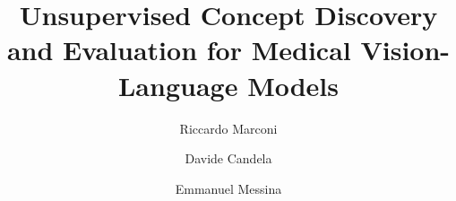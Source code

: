 \documentclass[sigconf, nonacm]{acmart}
\begin{document}
\raggedbottom

\title{Unsupervised Concept Discovery and Evaluation for Medical Vision-Language Models}

\author{Riccardo Marconi}

\author{Davide Candela}
\author{Emmanuel Messina}



\begin{abstract}

\end{abstract}



\keywords{}



\maketitle











\end{document}

